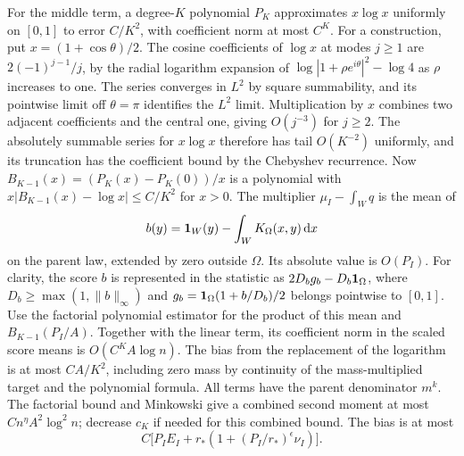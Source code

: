 For the middle term, a degree-\(K\) polynomial \(P_K\)
approximates \(x\log x\) uniformly on \([0,1]\) to error
\(C/K^2\), with coefficient norm at most \(C^K\).
For a construction, put \(x=(1+\cos\theta)/2\).
The cosine coefficients of \(\log x\) at modes \(j\ge1\) are
\(2(-1)^{j-1}/j\), by the radial
logarithm expansion of \(\log|1+\rho e^{i\theta}|^2-\log 4\)
as \(\rho\) increases to one. The series converges in \(L^2\)
by square summability, and its pointwise limit off
\(\theta=\pi\) identifies the \(L^2\) limit. Multiplication by
\(x\) combines two adjacent coefficients and the central one,
giving \(O(j^{-3})\) for \(j\ge2\). The absolutely summable
series for \(x\log x\) therefore has tail \(O(K^{-2})\)
uniformly, and its truncation has the coefficient bound by
the Chebyshev recurrence. Now \(B_{K-1}(x)=(P_K(x)-P_K(0))/x\)
is a polynomial with
\(x|B_{K-1}(x)-\log x|\le C/K^2\) for \(x>0\).
The multiplier \(\mu_I-\int_W q\) is the mean of
\[
 b(y)=\mathbf 1_W(y)-\int_W K_\Omega(x,y)\,\mathrm d x
\]
on the parent law, extended by zero outside \(\Omega\).
Its absolute value is \(O(P_I)\).
For clarity, the score \(b\) is represented in the statistic
as \(2D_b g_b-D_b\mathbf 1_\Omega\), where
\(D_b\ge\max(1,\|b\|_\infty)\) and
\(g_b=\mathbf 1_\Omega(1+b/D_b)/2\) belongs pointwise to \([0,1]\).
Use the factorial polynomial estimator for the product of
this mean and \(B_{K-1}(P_I/A)\).
Together with the linear term, its coefficient norm in the
scaled score means is \(O(C^K A\log n)\).
The bias from the replacement of the logarithm is at most
\(C A/K^2\), including zero mass by continuity of the
mass-multiplied target and the polynomial formula.
All terms have the parent denominator \(m^k\).
The factorial bound and Minkowski give a combined second
moment at most \(C n^\eta A^2\log^2 n\); decrease \(c_K\) if
needed for this combined bound. The bias is at most
\begin{equation}\label{eq:low-bias}
 C\bigl[P_I E_I+r_*(1+(P_I/r_*)^\epsilon
                          \nu_I)\bigr].
\end{equation}

